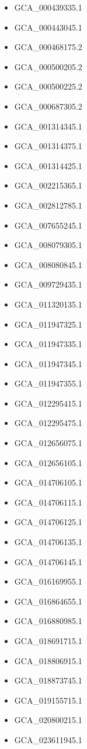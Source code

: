 \begin{itemize}
    \item GCA\_000439335.1
    \item GCA\_000443045.1
    \item GCA\_000468175.2
    \item GCA\_000500205.2
    \item GCA\_000500225.2
    \item GCA\_000687305.2
    \item GCA\_001314345.1
    \item GCA\_001314375.1
    \item GCA\_001314425.1
    \item GCA\_002215365.1
    \item GCA\_002812785.1
    \item GCA\_007655245.1
    \item GCA\_008079305.1
    \item GCA\_008080845.1
    \item GCA\_009729435.1
    \item GCA\_011320135.1
    \item GCA\_011947325.1
    \item GCA\_011947335.1
    \item GCA\_011947345.1
    \item GCA\_011947355.1
    \item GCA\_012295415.1
    \item GCA\_012295475.1
    \item GCA\_012656075.1
    \item GCA\_012656105.1
    \item GCA\_014706105.1
    \item GCA\_014706115.1
    \item GCA\_014706125.1
    \item GCA\_014706135.1
    \item GCA\_014706145.1
    \item GCA\_016169955.1
    \item GCA\_016864655.1
    \item GCA\_016880985.1
    \item GCA\_018691715.1
    \item GCA\_018806915.1
    \item GCA\_018873745.1
    \item GCA\_019155715.1
    \item GCA\_020800215.1
    \item GCA\_023611945.1

\end{itemize}
